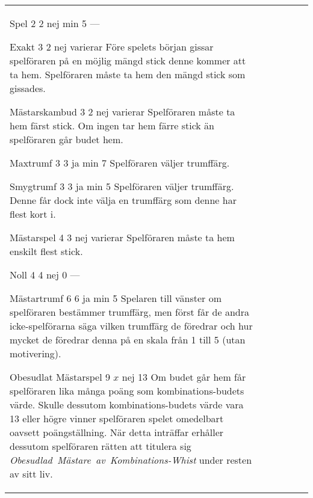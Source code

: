 \begin{table}
\begin{center}
\begin{tabularx}{\textwidth}{
			l
			S[table-number-alignment=center, table-format=1.0]
			S[table-number-alignment=center, table-format=1.0]
			cc|X
		}
				\standardBidItem%
				{Spel}
				{2}
				{2}
				{nej}
				{min 5}
				{%
					---
				}

				\standardBidItem%
				{Exakt}
				{3}
				{2}
				{nej}
				{varierar}
				{%
					Före spelets början gissar spelföraren på en möjlig mängd stick denne kommer att ta hem. Spelföraren måste ta hem den mängd stick som gissades.
				}

				\standardBidItem%
				{Mästarskambud}
				{3}
				{2}
				{nej}
				{varierar}
				{%
					Spelföraren måste ta hem färst stick. Om ingen tar hem färre stick än spelföraren går budet hem.
				}

				\standardBidItem%
				{Maxtrumf}
				{3}
				{3}
				{ja}
				{min 7}
				{%
					Spelföraren väljer trumffärg.
				}

				\standardBidItem%
				{Smygtrumf}
				{3}
				{3}
				{ja}
				{min 5}
				{%
					Spelföraren väljer trumffärg. Denne får dock inte välja en trumffärg som denne har flest kort i.
				}

				\standardBidItem%
				{Mästarspel}
				{4}
				{3}
				{nej}
				{varierar}
				{%
					Spelföraren måste ta hem enskilt flest stick.
				}

				\standardBidItem%
				{Noll}
				{4}
				{4}
				{nej}
				{0}
				{%
					---
				}

				\standardBidItem%
				{Mästartrumf}
				{6}
				{6}
				{ja}
				{min 5}
				{%
					Spelaren till vänster om spelföraren bestämmer trumffärg, men först får de andra icke-spelförarna säga vilken trumffärg de föredrar och hur mycket de föredrar denna på en skala från 1 till 5 (utan motivering).
				}

				\standardBidItem%
				{Obesudlat Mästarspel}
				{9}
				{$x$}
				{nej}
				{13}
				{%
					Om budet går hem får spelföraren lika många poäng som kombinations-budets värde. Skulle dessutom kombinations-budets värde vara 13 eller högre vinner spelföraren spelet omedelbart oavsett poängställning. När detta inträffar erhåller dessutom spelföraren rätten att titulera sig \emph{Obesudlad~Mästare~av~Kombinations-Whist} under resten av sitt liv.
				}
		\end{tabularx}
	\end{center}
\end{table}

